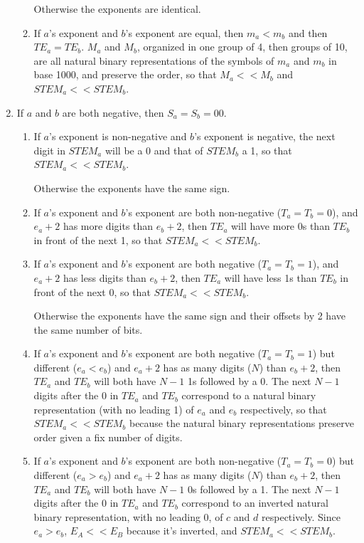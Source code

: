 \documentclass[final,leqno,onefignum,onetabnum]{siamltex1213}
\begin{document}
\begin{enumerate}
\begin{enumerate}
  Otherwise the exponents are identical.
  \item If $a$'s exponent and $b$'s exponent are equal, then $m_a < m_b$ and then $TE_a=TE_b$. $M_a$ and $M_b$, organized in one group of 4, then groups of 10, are all natural binary representations of the symbols of $m_a$ and $m_b$ in base 1000, and preserve the order, so that $M_a<<M_b$ and $STEM_a << STEM_b$.
  \end{enumerate}


\item If $a$ and $b$ are both negative, then $S_a=S_b=00$.
  \begin{enumerate}
  \item If $a$'s exponent is non-negative and $b$'s exponent is negative, the next digit in $STEM_a$ will be a 0 and that of $STEM_b$ a 1, so that $STEM_a << STEM_b$.

  Otherwise the exponents have the same sign.
  \item If $a$'s exponent and $b$'s exponent are both non-negative ($T_a=T_b=0$), and $e_a+2$ has more digits than $e_b+2$, then $TE_a$ will have more 0s than $TE_b$ in front of the next 1, so that $STEM_a << STEM_b$.
  \item If $a$'s exponent and $b$'s exponent are both negative ($T_a=T_b=1$), and $e_a+2$ has less digits than $e_b+2$, then $TE_a$ will have less 1s than $TE_b$ in front of the next 0, so that $STEM_a << STEM_b$.

  Otherwise the exponents have the same sign and their offsets by 2 have the same number of bits.
  \item If $a$'s exponent and $b$'s exponent are both negative ($T_a=T_b=1$) but different ($e_a < e_b$) and $e_a+2$ has as many digits ($N$) than $e_b+2$, then $TE_a$ and $TE_b$ will both have $N-1$ 1s followed by a 0. The next $N-1$ digits after the 0 in $TE_a$ and $TE_b$ correspond to a natural binary representation (with no leading 1) of $e_a$ and $e_b$ respectively, so that $STEM_a << STEM_b$ because the natural binary representations preserve order given a fix number of digits.
  \item If $a$'s exponent and $b$'s exponent are both non-negative ($T_a=T_b=0$) but different ($e_a > e_b$) and $e_a+2$ has as many digits ($N$) than $e_b+2$, then $TE_a$ and $TE_b$ will both have $N-1$ 0s followed by a 1. The next $N-1$ digits after the 0 in $TE_a$ and $TE_b$ correspond to an inverted natural binary representation, with no leading 0, of $c$ and $d$ respectively. Since $e_a > e_b$, $E_A << E_B$ because it's inverted, and $STEM_a << STEM_b$.


\end{enumerate}
\end{enumerate}
\end{document}
